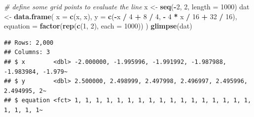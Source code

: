 \documentclass[
]{book}
\newenvironment{Shaded}{\begin{snugshade}}{\end{snugshade}}
\newcommand{\CommentTok}[1]{\textcolor[rgb]{0.56,0.35,0.01}{\textit{#1}}}
\newcommand{\DataTypeTok}[1]{\textcolor[rgb]{0.13,0.29,0.53}{#1}}
\newcommand{\DecValTok}[1]{\textcolor[rgb]{0.00,0.00,0.81}{#1}}
\newcommand{\FloatTok}[1]{\textcolor[rgb]{0.00,0.00,0.81}{#1}}
\newcommand{\KeywordTok}[1]{\textcolor[rgb]{0.13,0.29,0.53}{\textbf{#1}}}
\newcommand{\NormalTok}[1]{#1}
\newcommand{\OperatorTok}[1]{\textcolor[rgb]{0.81,0.36,0.00}{\textbf{#1}}}
\newcommand{\StringTok}[1]{\textcolor[rgb]{0.31,0.60,0.02}{#1}}
\theoremstyle{definition}
\theoremstyle{definition}
\theoremstyle{definition}
\theoremstyle{definition}
\theoremstyle{remark}
\begin{document}
\begin{Shaded}
\begin{Highlighting}[]
\CommentTok{# define some grid points to evaluate the line}
\NormalTok{x <-}\StringTok{ }\KeywordTok{seq}\NormalTok{(}\OperatorTok{-}\DecValTok{2}\NormalTok{, }\DecValTok{2}\NormalTok{, }\DataTypeTok{length =} \DecValTok{1000}\NormalTok{)}
\NormalTok{dat <-}\StringTok{ }\KeywordTok{data.frame}\NormalTok{(}
    \DataTypeTok{x =} \KeywordTok{c}\NormalTok{(x, x),}
    \DataTypeTok{y =} \KeywordTok{c}\NormalTok{(}\OperatorTok{-}\NormalTok{x }\OperatorTok{/}\StringTok{ }\DecValTok{4} \OperatorTok{+}\StringTok{ }\DecValTok{8} \OperatorTok{/}\StringTok{ }\DecValTok{4}\NormalTok{, }\OperatorTok{-}\StringTok{ }\DecValTok{4} \OperatorTok{*}\StringTok{ }\NormalTok{x }\OperatorTok{/}\StringTok{ }\DecValTok{16} \OperatorTok{+}\StringTok{ }\DecValTok{32} \OperatorTok{/}\StringTok{ }\DecValTok{16}\NormalTok{),}
    \DataTypeTok{equation =} \KeywordTok{factor}\NormalTok{(}\KeywordTok{rep}\NormalTok{(}\KeywordTok{c}\NormalTok{(}\DecValTok{1}\NormalTok{, }\DecValTok{2}\NormalTok{), }\DataTypeTok{each =} \DecValTok{1000}\NormalTok{))}
\NormalTok{)}
\KeywordTok{glimpse}\NormalTok{(dat)}
\end{Highlighting}
\end{Shaded}

\begin{verbatim}
## Rows: 2,000
## Columns: 3
## $ x        <dbl> -2.000000, -1.995996, -1.991992, -1.987988, -1.983984, -1.979~
## $ y        <dbl> 2.500000, 2.498999, 2.497998, 2.496997, 2.495996, 2.494995, 2~
## $ equation <fct> 1, 1, 1, 1, 1, 1, 1, 1, 1, 1, 1, 1, 1, 1, 1, 1, 1, 1, 1, 1, 1~
\end{verbatim}

\begin{Shaded}
\end{Shaded}
\end{document}
